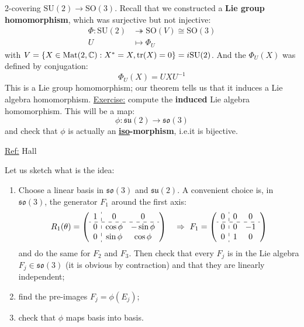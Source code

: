 \documentclass[../main.tex]{subfiles}
\begin{document}
\begin{example}
2-covering $\textrm{SU}(2)\to\textrm{SO}(3)$. Recall that we constructed a \textbf{Lie group homomorphism}, which was surjective but not injective:
\[
\begin{split}
\Phi:\textrm{SU}(2)&\twoheadrightarrow\textrm{SO}(V)\cong\textrm{SO}(3)\\
U&\mapsto\Phi_{U}
\end{split}
\]
with $V=\Bqty{X\in\textrm{Mat}(2,\mathbb{C}):X^\ast=X,\tr(X)=0}=i\textrm{SU}(2)$. And the $\Phi_U(X)$ was defined by conjugation:
\[
\Phi_U(X)=UXU^{-1}
\]
This is a Lie group homomorphism; our theorem tells us that it induces a Lie algebra homomorphism. \underline{Exercise:} compute the \textbf{induced} Lie algebra homomorphism. This will be a map:
\[
\phi:\mathfrak{su}(2)\to\mathfrak{so}(3)
\]
and check that $\phi$ is actually an \textbf{\underline{iso}-morphism}, i.e.it is bijective.

\underline{Ref:} Hall \cite{Hall2015_Ch3}

Let us sketch what is the idea:
\begin{enumerate}
    \item Choose a linear basis in $\mathfrak{so}(3)$ and $\mathfrak{su}(2)$. A convenient choice is, in $\mathfrak{so}(3)$,  the generator $F_1$ around the first axis:
    \[
    R_1(\theta)=\left(\begin{array}{c:cc}
    1 & 0 & 0 \\
    \hdashline
    0 & \cos\phi & -\sin\phi \\
    0 & \sin\phi & \cos\phi
    \end{array}\right) \quad \Rightarrow \ F_1=
    \left(\begin{array}{c:cc}
    0 & 0 & 0 \\
    \hdashline
    0 & 0 & -1 \\
    0 & 1 & 0
    \end{array}\right)
    \]
    and do the same for $F_2$ and $F_3$. Then check that every $F_j$ is in the Lie algebra $F_j\in\mathfrak{so}(3)$ (it is obvious by contraction) and that they are linearly independent;
    \item find the pre-images $F_j=\phi(E_j)$;
    \item check that $\phi$ maps basis into basis.
\end{enumerate}
\end{example}
\end{document}
